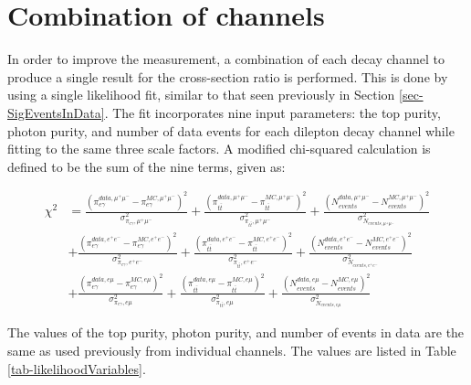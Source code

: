 
\section{Combination of channels} \label{sec-CombinationOfChannels}

In order to improve the measurement, a combination of each decay channel to produce a single result for the cross-section ratio is performed. This is done by using a single likelihood fit, similar to that seen previously in Section \ref{sec-SigEventsInData}. The fit incorporates nine input parameters: the top purity, photon purity, and number of data events for each dilepton decay channel while fitting to the same three scale factors. A modified chi-squared calculation is defined to be the sum of the nine terms, given as:

\begin{equation}
\begin{split}
\chi^2 & = \frac{\left(\pi^{data,\mu^+\mu^-}_{e\gamma} - \pi^{MC,\mu^+\mu^-}_{e\gamma}\right)^2}{\sigma^2_{\pi_{e\gamma},\mu^+\mu^-}} + \frac{\left(\pi^{data,\mu^+\mu^-}_{t\bar{t}} - \pi^{MC,\mu^+\mu^-}_{t\bar{t}}\right)^2}{\sigma^2_{\pi_{t\bar{t}},\mu^+\mu^-}} + \frac{\left(N^{data,\mu^+\mu^-}_{events} - N^{MC,\mu^+\mu^-}_{events}\right)^2}{\sigma^2_{N_{events,\mu^+\mu^-}}} \\
& + \frac{\left(\pi^{data,e^+e^-}_{e\gamma} - \pi^{MC,e^+e^-}_{e\gamma}\right)^2}{\sigma^2_{\pi_{e\gamma},e^+e^-}} + \frac{\left(\pi^{data,e^+e^-}_{t\bar{t}} - \pi^{MC,e^+e^-}_{t\bar{t}}\right)^2}{\sigma^2_{\pi_{t\bar{t}},e^+e^-}} + \frac{\left(N^{data,e^+e^-}_{events} - N^{MC,e^+e^-}_{events}\right)^2}{\sigma^2_{N_{events,e^+e^-}}} \\
& + \frac{\left(\pi^{data,e\mu}_{e\gamma} - \pi^{MC,e\mu}_{e\gamma}\right)^2}{\sigma^2_{\pi_{e\gamma},e\mu}} + \frac{\left(\pi^{data,e\mu}_{t\bar{t}} - \pi^{MC,e\mu}_{t\bar{t}}\right)^2}{\sigma^2_{\pi_{t\bar{t}},e\mu}} + \frac{\left(N^{data,e\mu}_{events} - N^{MC,e\mu}_{events}\right)^2}{\sigma^2_{N_{events,e\mu}}} 
\end{split}
\end{equation}

The values of the top purity, photon purity, and number of events in data are the same as used previously from individual channels. The values are listed in Table \ref{tab-likelihoodVariables}.  

